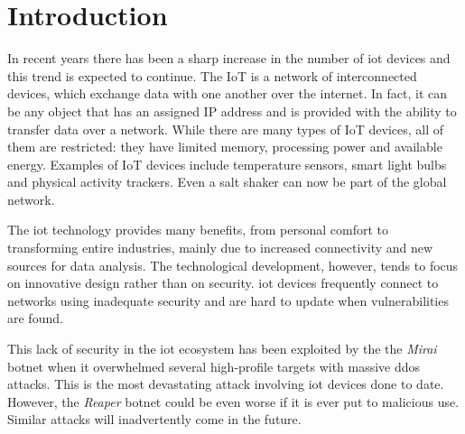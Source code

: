 
\chapter{Introduction}
\label{chapter:introduction}

In recent years there has been a sharp increase in the number of \gls{iot}
devices and this trend is expected to continue\cite{IoTnumb83:online}. The IoT is a network
of interconnected devices, which exchange data with one another over
the internet. In fact, it can be any object that has an assigned
IP address and is provided with the ability to transfer data over a network. 
While there are many types of IoT devices, all of them
are restricted: they have limited memory, processing power and
available energy. Examples of IoT devices include temperature sensors,
smart light bulbs and physical activity trackers.
Even a salt shaker\cite{SMALTThe76:online} can now be part of the global network.

The \gls{iot} technology provides many benefits, from personal comfort to
transforming entire industries, mainly due to increased connectivity and
new sources for data analysis. The technological development, however, tends to focus on
innovative design rather than on security. \gls{iot} devices frequently
connect to networks using inadequate security and are hard to update when
vulnerabilities are found.

This lack of security in the \gls{iot} ecosystem has been exploited by the
the \textit{Mirai} botnet\cite{sec17ant94:online} when it overwhelmed several high-profile
targets with massive \gls{ddos} attacks. This is the most devastating attack involving \gls{iot}
devices done to date. However, the \textit{Reaper} botnet\cite{ReaperCa10:online} could be
even worse if it is ever put to malicious use. Similar attacks will inadvertently
come in the future.

